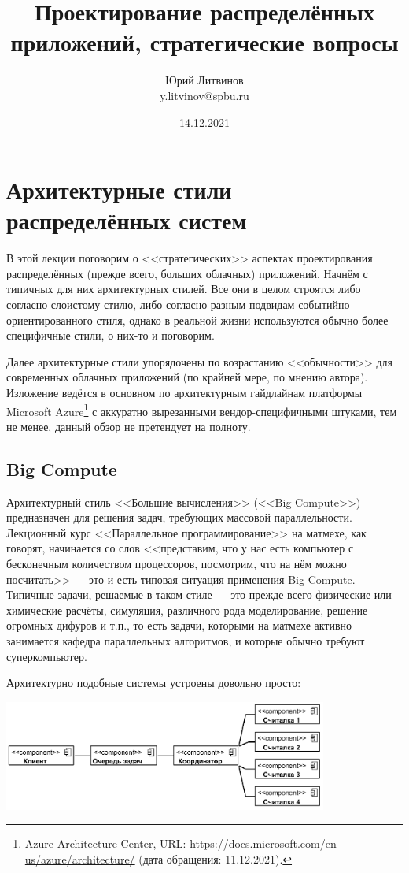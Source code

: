 \documentclass[a5paper]{article}
\title{Проектирование распределённых приложений, стратегические вопросы}
\author{Юрий Литвинов\\\small{y.litvinov@spbu.ru}}
\date{14.12.2021}
\begin{document}
\maketitle
\thispagestyle{empty}

\section{Архитектурные стили распределённых систем}

В этой лекции поговорим о <<стратегических>> аспектах проектирования распределённых (прежде всего, больших облачных) приложений. Начнём с типичных для них архитектурных стилей. Все они в целом строятся либо согласно слоистому стилю, либо согласно разным подвидам событийно-ориентированного стиля, однако в реальной жизни используются обычно более специфичные стили, о них-то и поговорим.

Далее архитектурные стили упорядочены по возрастанию <<обычности>> для современных облачных приложений (по крайней мере, по мнению автора). Изложение ведётся в основном по архитектурным гайдлайнам платформы Microsoft Azure\footnote{Azure Architecture Center, URL: \url{https://docs.microsoft.com/en-us/azure/architecture/} (дата обращения: 11.12.2021).} с аккуратно вырезанными вендор-специфичными штуками, тем не менее, данный обзор не претендует на полноту.

\subsection{Big Compute}

Архитектурный стиль <<Большие вычисления>> (<<Big Compute>>) предназначен для решения задач, требующих массовой параллельности. Лекционный курс <<Параллельное программирование>> на матмехе, как говорят, начинается со слов <<представим, что у нас есть компьютер с бесконечным количеством процессоров, посмотрим, что на нём можно посчитать>> --- это и есть типовая ситуация применения Big Compute. Типичные задачи, решаемые в таком стиле --- это прежде всего физические или химические расчёты, симуляция, различного рода моделирование, решение огромных дифуров и т.п., то есть задачи, которыми на матмехе активно занимается кафедра параллельных алгоритмов, и которые обычно требуют суперкомпьютер. 

Архитектурно подобные системы устроены довольно просто:

\begin{center}
    \includegraphics[width=0.8\textwidth]{bigCompute.png}
\end{center}
\end{document}
